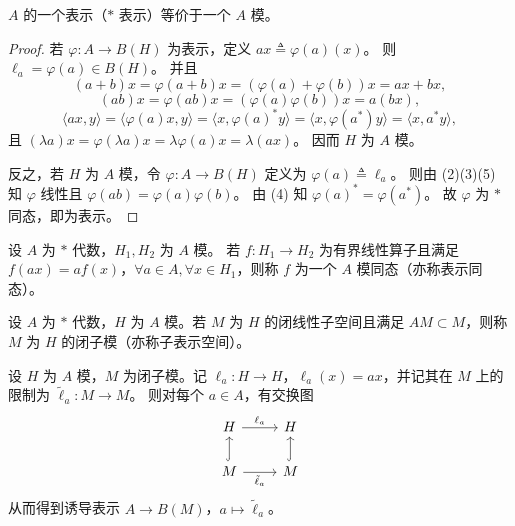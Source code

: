 \documentclass[lang=cn,a4paper,newtx,section]{elegantbook}
\begin{document}
  \begin{proposition}
    $A$ 的一个表示（$*$ 表示）等价于一个 $A$ 模。
  \end{proposition}

  \begin{proof}
    若 $\varphi:A\to B(H)$ 为表示，定义 $ax\triangleq\varphi(a)(x)$。
    则 $\ell_a=\varphi(a)\in B(H)$。
    并且
    \begin{equation*}
      (a+b)x=\varphi(a+b)x=(\varphi(a)+\varphi(b))x=ax+bx,
    \end{equation*}
    \begin{equation*}
      (ab)x=\varphi(ab)x=(\varphi(a)\varphi(b))x=a(bx),
    \end{equation*}
    \begin{equation*}
      \langle ax,y\rangle=\langle \varphi(a)x,y\rangle=\langle x,\varphi(a)^*y\rangle=\langle x,\varphi(a^*)y\rangle=\langle x,a^*y\rangle,
    \end{equation*}
    且 $(\lambda a)x=\varphi(\lambda a)x=\lambda\varphi(a)x=\lambda(ax)$。
    因而 $H$ 为 $A$ 模。

    反之，若 $H$ 为 $A$ 模，令 $\varphi:A\to B(H)$ 定义为 $\varphi(a)\triangleq \ell_a$。
    则由 (2)(3)(5) 知 $\varphi$ 线性且 $\varphi(ab)=\varphi(a)\varphi(b)$。
    由 (4) 知 $\varphi(a)^*=\varphi(a^*)$。
    故 $\varphi$ 为 $*$ 同态，即为表示。
  \end{proof}

  \begin{definition}
    设 $A$ 为 $*$ 代数，$H_1,H_2$ 为 $A$ 模。
    若 $f:H_1\to H_2$ 为有界线性算子且满足 $f(ax)=af(x)$，$\forall a\in A,\forall x\in H_1$，则称 $f$ 为一个 $A$ 模同态（亦称表示同态）。
  \end{definition}

  \begin{definition}
    设 $A$ 为 $*$ 代数，$H$ 为 $A$ 模。若 $M$ 为 $H$ 的闭线性子空间且满足 $AM\subset M$，则称 $M$ 为 $H$ 的闭子模（亦称子表示空间）。
  \end{definition}

  \begin{remark}
    设 $H$ 为 $A$ 模，$M$ 为闭子模。记 $\ell_a:H\to H$，$\ell_a(x)=ax$，并记其在 $M$ 上的限制为 $\tilde\ell_a:M\to M$。
    则对每个 $a\in A$，有交换图
    \[
      \begin{tikzcd}
        H \arrow[r,"\ell_a"] & H \\
        M \arrow[u,hook] \arrow[r,"\tilde\ell_a"'] & M \arrow[u,hook]
      \end{tikzcd}
    \]
    从而得到诱导表示 $A\to B(M)$，$a\mapsto \tilde\ell_a$。
  \end{remark}
\end{document}
